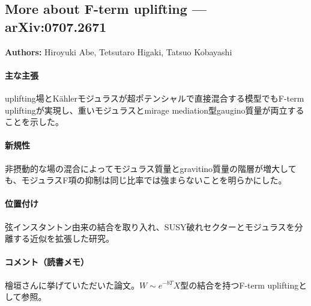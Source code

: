 \subsection{More about F-term uplifting --- arXiv:0707.2671}

\textbf{Authors:} Hiroyuki Abe, Tetsutaro Higaki, Tatsuo Kobayashi

\paragraph{主な主張}
uplifting場とK\"ahlerモジュラスが超ポテンシャルで直接混合する模型でもF-term upliftingが実現し、重いモジュラスとmirage mediation型gaugino質量が両立することを示した\cite{Abe:2007yb}。

\paragraph{新規性}
非摂動的な場の混合によってモジュラス質量とgravitino質量の階層が増大しても、モジュラスF項の抑制は同じ比率では強まらないことを明らかにした。

\paragraph{位置付け}
弦インスタントン由来の結合を取り入れ、SUSY破れセクターとモジュラスを分離する近似を拡張した研究。

\paragraph{コメント（読書メモ）}
檜垣さんに挙げていただいた論文。$W\sim e^{-bT}X$型の結合を持つF-term upliftingとして参照。
